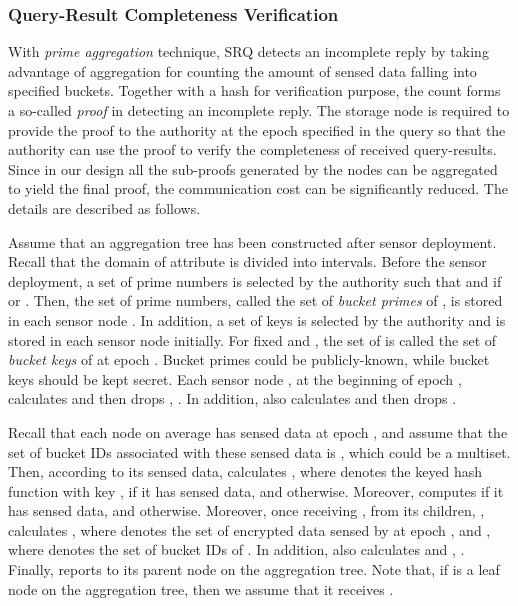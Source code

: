\documentclass[conference]{IEEEtran}
\begin{document}
\subsubsection{Query-Result Completeness Verification}\label{sec: Query-Result Completeness Verification}
With \emph{prime aggregation} technique, SRQ detects an incomplete reply by taking advantage of aggregation for counting the amount of sensed data falling into specified buckets. Together with a hash for verification purpose, the count forms a so-called \emph{proof} in detecting an incomplete reply. The storage node  is required to provide the proof to the authority at the epoch specified in the query so that the authority can use the proof to verify the completeness of received query-results. Since in our design all the sub-proofs generated by the nodes can be aggregated to yield the final proof, the communication cost can be significantly reduced. The details are described as follows.

Assume that an aggregation tree \cite{mfhh02} has been constructed after sensor deployment. Recall that the domain of attribute  is divided into  intervals. Before the sensor deployment, a set  of  prime numbers is selected by the authority such that  and  if  or . Then, the set  of  prime numbers, called the set of \emph{bucket primes} of , is stored in each sensor node . In addition, a set  of  keys is selected by the authority and is stored in each sensor node  initially. For fixed  and , the set of  is called the set of \emph{bucket keys} of  at epoch . Bucket primes could be publicly-known, while bucket keys should be kept secret. Each sensor node , at the beginning of epoch , calculates  and then drops , . In addition,  also calculates  and then drops .

Recall that each node  on average has  sensed data at epoch , and assume that the set of  bucket IDs associated with these  sensed data is , which could be a multiset. Then, according to its sensed data,  calculates , where  denotes the keyed hash function with key , if it has sensed data, and  otherwise. Moreover,  computes  if it has sensed data, and  otherwise. Moreover, once receiving ,  from its  children, ,  calculates , where  denotes the set of encrypted data sensed by  at epoch , and , where  denotes the set of bucket IDs of . In addition,  also calculates  and , . Finally,  reports  to its parent node on the aggregation tree. Note that, if  is a leaf node on the aggregation tree, then we assume that it receives .
\end{document}
